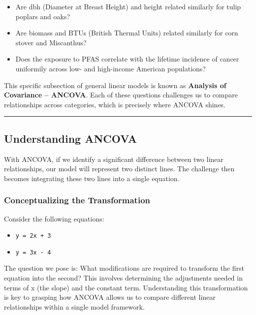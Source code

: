 \documentclass[
  letterpaper,
  DIV=11,
  numbers=noendperiod]{scrreprt}
\providecommand{\tightlist}{%
  \setlength{\itemsep}{0pt}\setlength{\parskip}{0pt}}
\begin{document}
\begin{itemize}
\item
  Are dbh (Diameter at Breast Height) and height related similarly for
  tulip poplars and oaks?
\item
  Are biomass and BTUs (British Thermal Units) related similarly for
  corn stover and Miscanthus?
\item
  Does the exposure to PFAS correlate with the lifetime incidence of
  cancer uniformily across low- and high-income American populations?
\end{itemize}

This specific subsection of general linear models is known as
\textbf{Analysis of Covariance -- ANCOVA}. Each of these questions
challenges us to compare relationships across categories, which is
precisely where ANCOVA shines.

\begin{center}\rule{0.5\linewidth}{0.5pt}\end{center}

\subsection{Understanding ANCOVA}\label{understanding-ancova}

With ANCOVA, if we identify a significant difference between two linear
relationships, our model will represent two distinct lines. The
challenge then becomes integrating these two lines into a single
equation.

\subsubsection{Conceptualizing the
Transformation}\label{conceptualizing-the-transformation}

Consider the following equations:

\begin{itemize}
\tightlist
\item
  \texttt{y\ =\ 2x\ +\ 3}
\item
  \texttt{y\ =\ 3x\ -\ 4}
\end{itemize}

The question we pose is: What modifications are required to transform
the first equation into the second? This involves determining the
adjustments needed in terms of x (the slope) and the constant term.
Understanding this transformation is key to grasping how ANCOVA allows
us to compare different linear relationships within a single model
framework.
\end{document}
